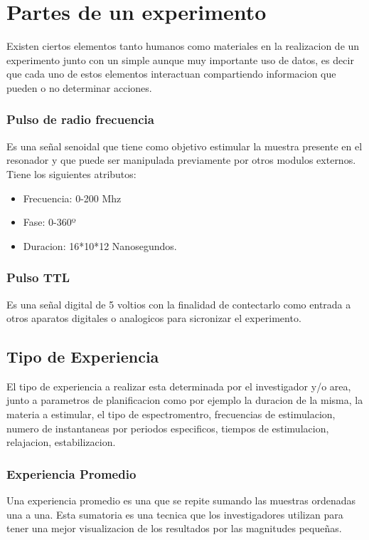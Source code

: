 \section{Partes de un experimento}

Existen ciertos elementos tanto humanos como materiales en la realizacion de un experimento junto con un 
simple aunque muy importante uso de datos, es decir que cada uno de estos elementos interactuan compartiendo
informacion que pueden o no determinar acciones.

\subsubsection{Pulso de radio frecuencia}
Es una señal senoidal que tiene como objetivo
estimular la muestra presente en el resonador
y que puede ser manipulada previamente
por otros modulos externos. Tiene los siguientes atributos:
    \begin{itemize}
        \item Frecuencia: 0-200 Mhz
        \item Fase: 0-360º
        \item Duracion: 16*10*12 Nanosegundos.
    \end{itemize}

\subsubsection{Pulso TTL}
Es una señal digital de 5 voltios con la finalidad de contectarlo como entrada a otros aparatos digitales o analogicos para sicronizar el experimento.

\subsection{Tipo de Experiencia}
El tipo de experiencia a realizar esta determinada por el investigador y/o area, junto a parametros de planificacion
como por ejemplo la duracion de la misma, la materia a estimular, el tipo de espectromentro, frecuencias
de estimulacion, numero de instantaneas por periodos especificos, tiempos de estimulacion, relajacion, estabilizacion.

\subsubsection{Experiencia Promedio}
Una experiencia promedio es una que se repite sumando las muestras ordenadas una a una. Esta sumatoria es una tecnica que los investigadores utilizan para tener una mejor visualizacion de los
resultados por las magnitudes pequeñas.

